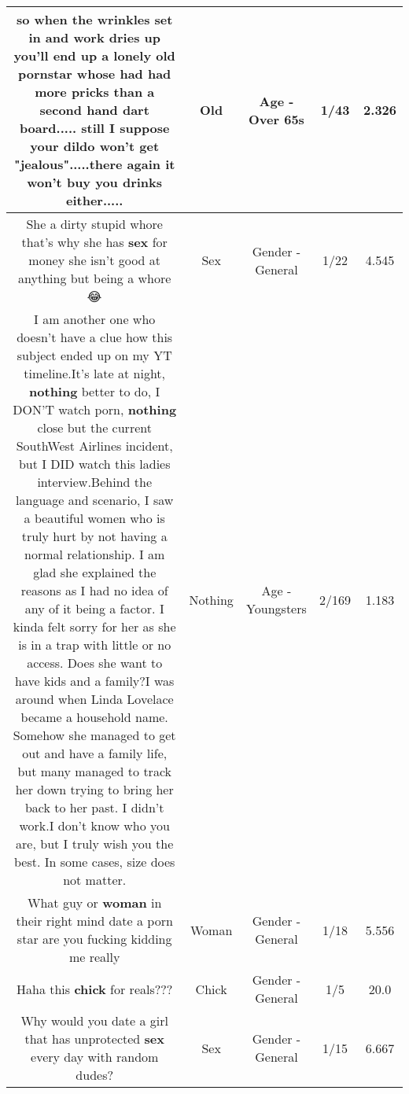 \documentclass[11pt]{article}
\newlength\mylength
\begin{document}
\begin{center}
\begin{longtable}{|C{.65\mylength}|C{.30\mylength}|C{.12\mylength}|C{.12\mylength}|C{.12\mylength}|}
  \small so when the wrinkles set in and work dries up you'll end up a lonely \textbf{old} pornstar whose had had more pricks than a second hand dart board..... still I suppose your dildo won't get "jealous".....there again it won't buy you drinks either.....\normalsize   & Old & Age - Over 65s & 1/43 & 2.326 \\  \hline
  \small She a dirty stupid whore that's why she has \textbf{sex} for money she isn't good at anything but being a whore 😂\normalsize   & Sex & Gender - General & 1/22 & 4.545 \\  \hline
  \small I am another one who doesn't have a clue how this subject ended up on my YT timeline.It's late at night, \textbf{nothing} better to do, I DON'T watch porn, \textbf{nothing} close but the current SouthWest Airlines incident, but I DID watch this ladies interview.Behind the language and scenario, I saw a beautiful women who is truly hurt by not having a normal relationship.  I am glad she explained the reasons as I had no idea of any of it being a factor.  I kinda felt sorry for her as she is in a trap with little or no access.  Does she want to have kids and a family?I was around when Linda Lovelace became a household name.  Somehow she managed to get out and have a family life, but many managed to track her down trying to bring her back to her past.  I didn't work.I don't know who you are, but I truly wish you the best.  In some cases, size does not matter.\normalsize   & Nothing & Age - Youngsters & 2/169 & 1.183 \\  \hline
  \small What guy or \textbf{woman} in their right mind date a porn star are you fucking kidding me really\normalsize   & Woman & Gender - General & 1/18 & 5.556 \\  \hline
  \small Haha this \textbf{chick} for reals???\normalsize   & Chick & Gender - General & 1/5 & 20.0 \\  \hline
  \small Why would you date a girl that has unprotected \textbf{sex} every day with random dudes?\normalsize   & Sex & Gender - General & 1/15 & 6.667 \\  \hline

\end{longtable}
\end{center}
\end{document}
